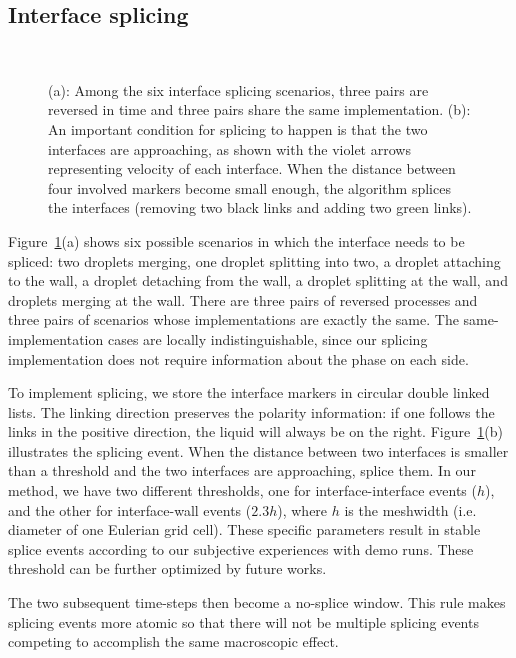 \documentclass{jfm}
\begin{document}
\subsection{Interface splicing} \label{subsec:splice}
\begin{figure}
\centering
{}\quad
{}\\
\caption{\footnotesize (a): Among the six interface splicing scenarios, three pairs are reversed in time and three pairs share the same implementation. (b): An important condition for splicing to happen is that the two interfaces are approaching, as shown with the violet arrows representing velocity of each interface. When the distance between four involved markers become small enough, the algorithm splices the interfaces (removing two black links and adding two green links).}
\label{fig:splice}
\end{figure}
Figure~\ref{fig:splice}(a) shows six possible scenarios in which the interface needs to be spliced: two droplets merging, one droplet splitting into two, a droplet attaching to the wall, a droplet detaching from the wall, a droplet splitting at the wall, and droplets merging at the wall. There are three pairs of reversed processes and three pairs of scenarios whose implementations are exactly the same. The same-implementation cases are locally indistinguishable, since our splicing implementation does not require information about the phase on each side. 

To implement splicing, we store the interface markers in circular double linked lists. The linking direction preserves the polarity information: if one follows the links in the positive direction, the liquid will always be on the right. Figure~\ref{fig:splice}(b) illustrates the splicing event. When the distance between two interfaces is smaller than a threshold and the two interfaces are approaching, splice them. In our method, we have two different thresholds, one for interface-interface events ($h$), and the other for interface-wall events ($2.3h$), where $h$ is the meshwidth (i.e. diameter of one Eulerian grid cell). These specific parameters result in stable splice events according to our subjective experiences with demo runs. These threshold can be further optimized by future works. 

The two subsequent time-steps then become a no-splice window. This rule makes splicing events more atomic so that there will not be multiple splicing events competing to accomplish the same macroscopic effect. 
\end{document}
